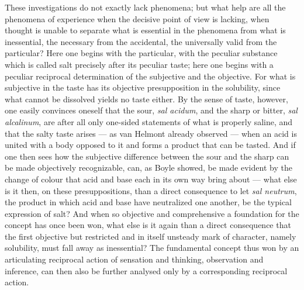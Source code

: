 \documentclass[12pt,a4paper]{book}
\begin{document}
These investigations do not exactly lack phenomena; but what help are all the
phenomena of experience when the decisive point of view is lacking, when
thought is unable to separate what is essential in the phenomena from what is
inessential, the necessary from the accidental, the universally valid from the
particular? Here one begins with the particular, with the peculiar substance
which is called salt precisely after its peculiar taste; here one begins with a
peculiar reciprocal determination of the subjective and the objective. For what
is subjective in the taste has its objective presupposition in the solubility,
since what cannot be dissolved yields no taste either. By the sense of taste,
however, one easily convinces oneself that the sour, \textit{sal acidum}, and
the sharp or bitter, \textit{sal alcalinum}, are after all only one-sided
statements of what is properly saline, and that the salty taste arises --- as
van Helmont already observed --- when an acid is united with a body opposed to
it and forms a product that can be tasted. And if one then sees how the
subjective difference between the sour and the sharp can be made objectively
recognizable, can, as Boyle showed, be made evident
by the change of colour that acid and base each in its own way bring about ---
what else is it then, on these presuppositions, than a direct consequence to
let \textit{sal neutrum}, the product in which acid and base have neutralized
one another, be the typical expression of salt? And when so objective and
comprehensive a foundation for the concept has once been won, what else is it
again than a direct consequence that the first objective but restricted and in
itself unsteady mark of character, namely solubility, must fall away as
inessential? The fundamental concept thus won by an articulating reciprocal
action of sensation and thinking, observation and inference, can then also be
further analysed only by a corresponding reciprocal action.
\end{document}

